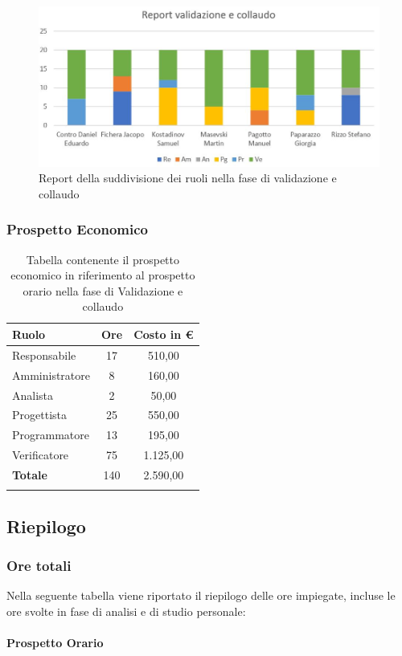 \documentclass[../piano_di_progetto.tex]{subfiles}
\begin{document}
\begin{figure}[H]
\centering
\includegraphics[width=12cm]{src/img/report/report_valid_collaudo}
\caption{Report della suddivisione dei ruoli nella fase di validazione e collaudo}
\end{figure}

\subsubsection{Prospetto Economico}

\begin{center}
	\begin{longtable}{|l|c|c|}
		\hline
		\rowcolor{lightgray}
		\textbf{Ruolo} & \textbf{Ore} & \textbf{Costo in €}\\

		\hline
		Responsabile & 17 & 510,00\\
		Amministratore & 8 & 160,00\\
		Analista & 2 & 50,00\\
		Progettista & 25 & 550,00\\
		Programmatore & 13 & 195,00\\
		Verificatore & 75 & 1.125,00\\
		\hline
		\textbf{Totale} & 140 & 2.590,00\\
		\hline
		\rowcolor{white}
		\caption{Tabella contenente il prospetto economico in riferimento al prospetto orario nella fase di Validazione e collaudo}
	\end{longtable}
\end{center}

\subsection{Riepilogo}%
\label{sub:riepilog}

\subsubsection{Ore totali}
Nella seguente tabella viene riportato il riepilogo delle ore impiegate, incluse le ore svolte in fase di analisi e di studio personale: \\ \\
\textbf{Prospetto Orario}
\end{document}
